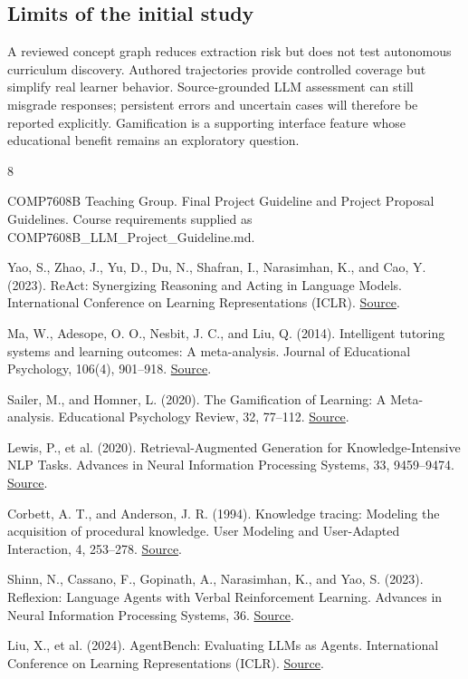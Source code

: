 \documentclass{article}
\begin{document}
\subsection{Limits of the initial study}

A reviewed concept graph reduces extraction risk but does not test autonomous curriculum discovery. Authored trajectories provide controlled coverage but simplify real learner behavior. Source-grounded LLM assessment can still misgrade responses; persistent errors and uncertain cases will therefore be reported explicitly. Gamification is a supporting interface feature whose educational benefit remains an exploratory question.

\begin{thebibliography}{8}

COMP7608B Teaching Group. Final Project Guideline and Project Proposal Guidelines. Course requirements supplied as COMP7608B\_LLM\_Project\_Guideline.md.

Yao, S., Zhao, J., Yu, D., Du, N., Shafran, I., Narasimhan, K., and Cao, Y. (2023). ReAct: Synergizing Reasoning and Acting in Language Models. International Conference on Learning Representations (ICLR). \href{https://arxiv.org/abs/2210.03629}{Source}.

Ma, W., Adesope, O. O., Nesbit, J. C., and Liu, Q. (2014). Intelligent tutoring systems and learning outcomes: A meta-analysis. Journal of Educational Psychology, 106(4), 901--918. \href{https://doi.org/10.1037/a0037123}{Source}.

Sailer, M., and Homner, L. (2020). The Gamification of Learning: A Meta-analysis. Educational Psychology Review, 32, 77--112. \href{https://doi.org/10.1007/s10648-019-09498-w}{Source}.

Lewis, P., et al. (2020). Retrieval-Augmented Generation for Knowledge-Intensive NLP Tasks. Advances in Neural Information Processing Systems, 33, 9459--9474. \href{https://arxiv.org/abs/2005.11401}{Source}.

Corbett, A. T., and Anderson, J. R. (1994). Knowledge tracing: Modeling the acquisition of procedural knowledge. User Modeling and User-Adapted Interaction, 4, 253--278. \href{https://doi.org/10.1007/BF01099821}{Source}.

Shinn, N., Cassano, F., Gopinath, A., Narasimhan, K., and Yao, S. (2023). Reflexion: Language Agents with Verbal Reinforcement Learning. Advances in Neural Information Processing Systems, 36. \href{https://papers.nips.cc/paper_files/paper/2023/hash/1b44b878bb782e6954cd888628510e90-Abstract-Conference.html}{Source}.

Liu, X., et al. (2024). AgentBench: Evaluating LLMs as Agents. International Conference on Learning Representations (ICLR). \href{https://arxiv.org/abs/2308.03688}{Source}.

\end{thebibliography}
\end{document}
